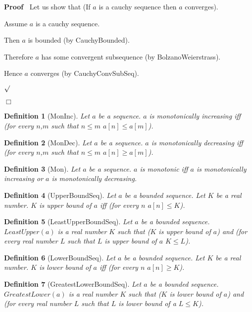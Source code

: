 \documentclass{article}
\newenvironment{forthel}{\begin{leftbar}}{\end{leftbar}}
\newenvironment{proof}{\noindent\textbf{Proof\ }}{\hspace*{\fill}$\Box$\medskip}
\newenvironment{subproof}{\begin{list}{}{}
		\item[\text{Proof}]}{\hfill $\surd$ \end{list}}
\newtheorem{definition}{Definition}
\begin{document}
\begin{forthel}
\begin{proof}
		Let us show that (If $a$ is a cauchy sequence then $a$ converges).
		
		\begin{subproof}
			Assume $a$ is a cauchy sequence.
			
			Then $a$ is bounded (by CauchyBounded).
			
			Therefore $a$ has some convergent subsequence (by BolzanoWeierstrass).
			
			Hence $a$ converges (by CauchyConvSubSeq).
			
		\end{subproof}
	\end{proof}
	
	
	\begin{definition}[MonInc]
		Let $a$ be a sequence. $a$ is monotonically increasing iff (for every $n$,$m$ such that $n \leq m$ $a[n] \leq a[m]$).
	\end{definition}
	
	\begin{definition}[MonDec]
		Let $a$ be a sequence. $a$ is monotonically decreasing iff (for every $n$,$m$ such that $n \leq m$ $a[n] \geq a[m]$).
	\end{definition}
	
	\begin{definition}[Mon]
		Let $a$ be a sequence. $a$ is monotonic iff $a$ is monotonically increasing or $a$ is monotonically decreasing.
	\end{definition}
	
	\begin{definition}[UpperBoundSeq]
		Let $a$ be a bounded sequence. Let $K$ be a real number. $K$ is upper bound of $a$ iff (for every $n$ $a[n] \leq K$).
	\end{definition}
	
	\begin{definition}[LeastUpperBoundSeq]
		Let $a$ be a bounded sequence. $LeastUpper(a)$ is a real number $K$ such that ($K$ is upper bound of $a$) and 
		(for every real number $L$ such that $L$ is upper bound of $a$ $K \leq L$).
	\end{definition}
	
	\begin{definition}[LowerBoundSeq]
		Let $a$ be a bounded sequence. Let $K$ be a real number. $K$ is lower bound of $a$ iff (for every $n$ $a[n] \geq K$).
	\end{definition}
	
	\begin{definition}[GreatestLowerBoundSeq]
		Let $a$ be a bounded sequence. $GreatestLower(a)$ is a real number $K$ such that ($K$ is lower bound of $a$) and
		(for every real number $L$ such that $L$ is lower bound of a $L \leq K$).
	\end{definition}
	

\end{forthel}
\end{document}
